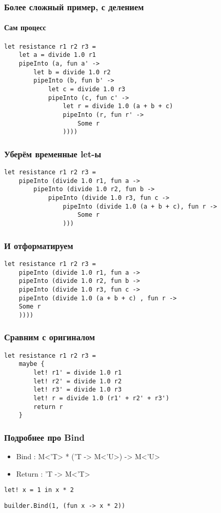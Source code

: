 \documentclass[xetex,mathserif,serif]{beamer}
\begin{document}
	\begin{frame}[fragile]
		\frametitle{Более сложный пример, с делением}
		\framesubtitle{Сам процесс}
		\begin{verbatim}
let resistance r1 r2 r3 = 
    let a = divide 1.0 r1
    pipeInto (a, fun a' ->
        let b = divide 1.0 r2
        pipeInto (b, fun b' ->
            let c = divide 1.0 r3
            pipeInto (c, fun c' ->
                let r = divide 1.0 (a + b + c)
                pipeInto (r, fun r' ->
                    Some r
                ))))
		\end{verbatim}
\end{frame}

	\begin{frame}[fragile]
		\frametitle{Уберём временные let-ы}
		\begin{verbatim}
let resistance r1 r2 r3 = 
    pipeInto (divide 1.0 r1, fun a ->
        pipeInto (divide 1.0 r2, fun b ->
            pipeInto (divide 1.0 r3, fun c ->
                pipeInto (divide 1.0 (a + b + c), fun r ->
                    Some r
                )))
		\end{verbatim}
\end{frame}

	\begin{frame}[fragile]
		\frametitle{И отформатируем}
		\begin{verbatim}
let resistance r1 r2 r3 = 
    pipeInto (divide 1.0 r1, fun a ->
    pipeInto (divide 1.0 r2, fun b ->
    pipeInto (divide 1.0 r3, fun c ->
    pipeInto (divide 1.0 (a + b + c) , fun r ->
    Some r
    ))))
		\end{verbatim}
\end{frame}

	\begin{frame}[fragile]
		\frametitle{Сравним с оригиналом}
		\begin{verbatim}
let resistance r1 r2 r3 = 
    maybe {
        let! r1' = divide 1.0 r1
        let! r2' = divide 1.0 r2
        let! r3' = divide 1.0 r3
        let! r = divide 1.0 (r1' + r2' + r3')
        return r
    }
		\end{verbatim}
\end{frame}

	\begin{frame}[fragile]
		\frametitle{Подробнее про Bind}
		\begin{itemize}
			\item Bind : M<'T> * ('T -> M<'U>) -> M<'U>
			\item Return : 'T -> M<'T>
		\end{itemize}
		\begin{verbatim}
let! x = 1 in x * 2
		\end{verbatim}
		\begin{verbatim}
builder.Bind(1, (fun x -> x * 2))
		\end{verbatim}
\end{frame}
\end{document}
